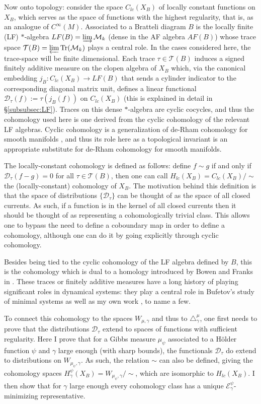 \documentclass[12pt]{amsart}
\theoremstyle{plain}
\theoremstyle{definition}
\begin{document}
Now onto topology: consider the space $C_{lc}(X_B)$ of locally constant functions on $X_B$, which serves as the space of functions with the highest regularity, that is, as an analogue of $C^\infty(M)$. Associated to a Bratteli diagram $B$ is the locally finite (LF) $*$‑algebra $LF(B)=\varinjlim \mathcal M_k$ (dense in the AF algebra $AF(B)$) whose trace space $\mathcal T(B)=\varprojlim \mathrm{Tr}(\mathcal M_k)$ plays a central role. In the cases considered here, the trace-space will be finite dimensional. Each trace $\tau\in\mathcal T(B)$ induces a signed finitely additive measure on the clopen algebra of $X_B$ which, via the canonical embedding $j_B:C_{lc}(X_B)\to LF(B)$ that sends a cylinder indicator to the corresponding diagonal matrix unit, defines a linear functional $\mathcal{D}_\tau(f):= \tau(j_B(f))$ on $C_{lc}(X_B)$ (this is explained in detail in \S \ref{subsubsec:LF}). Traces on this dense $*$-algebra are cyclic cocycles, and thus the cohomology used here is one derived from the cyclic cohomology of the relevant LF algebras. Cyclic cohomology is a generalization of de-Rham cohomology for smooth manifolds \cite[Chapter 3]{Connes:book}, and thus its role here as a topological invariant is an appropriate substitute for de-Rham cohomology for smooth manifolds. 

The locally-constant cohomology is defined as follows: define $f\sim g$ if and only if $\mathcal{D}_\tau(f-g) = 0$ for all $\tau\in\mathcal{T}(B)$, then one can call $H_{lc}(X_B) = C_{lc}(X_B)/\sim$ the (locally-constant) cohomology of $X_B$. The motivation behind this definition is that the space of distributions $\{\mathcal{D}_\tau\}$ can be thought of as the space of all closed currents. As such, if a function is in the kernel of all closed currents then it should be thought of as representing a cohomologically trivial class. This allows one to bypass the need to define a coboundary map in order to define a cohomology, although one can do it by going explicitly through cyclic cohomology.

Besides being tied to the cyclic cohomology of the LF algebra defined by $B$, this is the cohomology which is dual to a homology introduced by Bowen and Franks in \cite{BowenFranks:homology}. These traces or finitely additive measures have a long history of playing significant roles in dynamical systems: they play a central role in Bufetov's study of minimal systems \cite{bufetov:limitVershik} as well as my own work \cite{T:TTT}, to name a few.

To connect this cohomology to the spaces $W_{\mu,\gamma}$ and thus to $\triangle_\gamma^\mu$, one first needs to prove that the distributions $\mathcal{D}_\tau$ extend to spaces of functions with sufficient regularity. Here I prove that for a Gibbs measure $\mu_\psi$ associated to a H\"older function $\psi$ and $\gamma$ large enough (with sharp bounds), the functionals $\mathcal{D}_\tau$ do extend to distributions on $W_{\mu_\psi,\gamma}$. As such, the relation $\sim$ can also be defined, giving the cohomology spaces $H_\gamma^\psi(X_B) = W_{\mu_\psi,\gamma}/\sim$, which are isomorphic to $H_{lc}(X_B)$. I then show that for $\gamma$ large enough every cohomology class has a unique $\mathcal{E}_\gamma^\psi$-minimizing representative.
\end{document}

